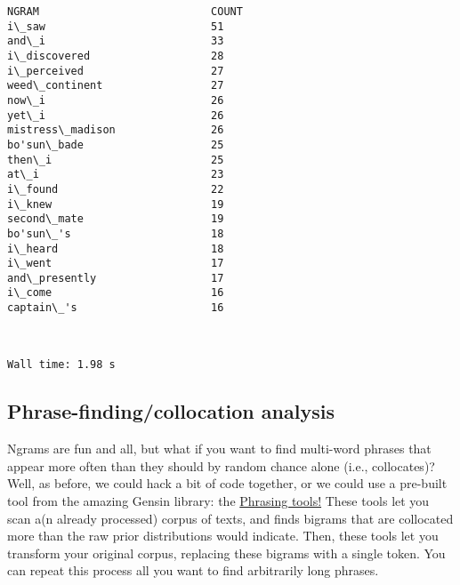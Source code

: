 \documentclass[11pt]{article}
\begin{document}
    \begin{Verbatim}[commandchars=\\\{\}]
NGRAM                         	COUNT
i\_saw                         	51
and\_i                         	33
i\_discovered                  	28
i\_perceived                   	27
weed\_continent                	27
now\_i                         	26
yet\_i                         	26
mistress\_madison              	26
bo'sun\_bade                   	25
then\_i                        	25
at\_i                          	23
i\_found                       	22
i\_knew                        	19
second\_mate                   	19
bo'sun\_'s                     	18
i\_heard                       	18
i\_went                        	17
and\_presently                 	17
i\_come                        	16
captain\_'s                    	16

    \end{Verbatim}

    \begin{center}
    \end{center}
    { \hspace*{\fill} \\}
    
    \begin{Verbatim}[commandchars=\\\{\}]
Wall time: 1.98 s

    \end{Verbatim}

    \hypertarget{phrase-findingcollocation-analysis}{%
\subsection{Phrase-finding/collocation
analysis}\label{phrase-findingcollocation-analysis}}

Ngrams are fun and all, but what if you want to find multi-word phrases
that appear more often than they should by random chance alone (i.e.,
collocates)? Well, as before, we could hack a bit of code together, or
we could use a pre-built tool from the amazing Gensin library: the
\href{https://radimrehurek.com/gensim/models/phrases.html}{Phrasing
tools!} These tools let you scan a(n already processed) corpus of texts,
and finds bigrams that are collocated more than the raw prior
distributions would indicate. Then, these tools let you transform your
original corpus, replacing these bigrams with a single token. You can
repeat this process all you want to find arbitrarily long phrases.
\end{document}
